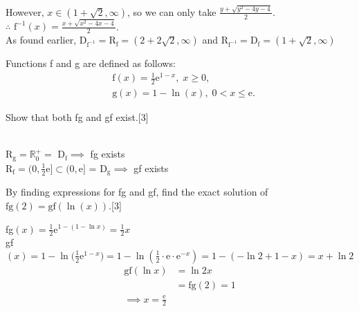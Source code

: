 \documentclass[12pt, a4 paper]{article}
\begin{document}
\begin{outline}[enumerate]
\begin{answer}
		However, $x \in (1+\sqrt{2},\infty)$, so we can only take $\frac{y+\sqrt{y^2-4y-4}}{2}$.\\
		$\therefore$\; $\textrm{f}^{-1}(x)=\frac{x+\sqrt{x^2-4x-4}}{2}$.\\
		As found earlier, $\textrm{D}_{\textrm{f}^{-1}}=\textrm{R}_{\textrm{f}}=(2+2\sqrt{2},\infty)$ and $\textrm{R}_{\textrm{f}^{-1}}=\textrm{D}_{\textrm{f}}=(1+\sqrt{2},\infty)$
	\end{answer}		
	\1 Functions f and g are defined as follows:
	\begin{align*}
		  & \textrm{f}(x)=\frac{1}{2}\mathrm{e}^{1-x},\;x\geq0, \\
		  & \textrm{g}(x)=1-\ln{(x)},\;0<x\leq{\mathrm{e}}.     
	\end{align*} %
			
	\2 Show that both fg and gf exist.\hfill[3]
	\begin{answer}
		\vspace{3mm}
		\color{black}
		\\
		\color{blue}
		R$_\textrm{g} = \mathbb{R}^+_0 =$ D$_\textrm{f}\implies$ fg exists \\
		R$_\textrm{f} = (0,\frac{1}{2}\mathrm{e}] \subset (0,\mathrm{e}]$ = D$_\textrm{g}\implies$ gf exists
	\end{answer}
			    
	\2 By finding expressions for fg and gf, find the exact solution of $\textrm{fg}(2)=\textrm{gf}(\ln{(x)})$.\hfill[3]\\
	\begin{answer}
		fg$(x)=\frac{1}{2}\mathrm{e}^{1-(1-\ln{x})} = \frac{1}{2}x $ \\ 
		gf$(x) = 1-\ln{(\frac{1}{2}\mathrm{e}^{1-x}}) = 1-\ln{(\frac{1}{2}\cdot \mathrm{e} \cdot \mathrm{e}^{-x})} = 1-(-\ln2+1-x) = x+\ln2$ 
		\begin{align*}
			\textrm{gf}(\ln x) & = \ln2x              \\
			                   & = \textrm{fg}(2) = 1 \\
			\implies x=\frac{\mathrm{e}}{2}
		\end{align*}
	\end{answer}
		

\end{outline}
\end{document}
